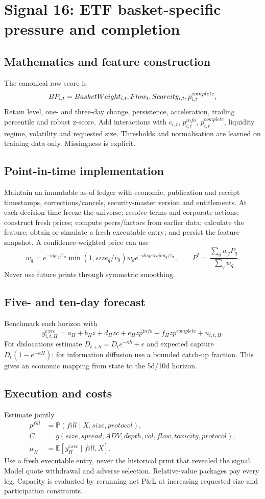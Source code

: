 \documentclass[10pt]{article}
\newcommand{\E}{\mathbb{E}}\newcommand{\Pp}{\mathbb{P}}
\begin{document}
\section{Signal 16: ETF basket-specific pressure and completion}
\subsection{Mathematics and feature construction}
The canonical raw score is
\begin{equation}BP_{i,t}=BasketWeight_{i,t}\\,Flow_t\\,Scarcity_{i,t}\\,p^{complete}_{i,t},\end{equation}
Retain level, one- and three-day change, persistence, acceleration, trailing percentile and robust z-score. Add interactions with $c_{i,t}$, $p^{info}_{i,t}$, $p^{complete}_{i,t}$, liquidity regime, volatility and requested size. Thresholds and normalisation are learned on training data only. Missingness is explicit.

\subsection{Point-in-time implementation}
Maintain an immutable as-of ledger with economic, publication and receipt timestamps, corrections/cancels, security-master version and entitlements. At each decision time freeze the universe; resolve terms and corporate actions; construct fresh prices; compute peers/factors from earlier data; calculate the feature; obtain or simulate a fresh executable entry; and persist the feature snapshot. A confidence-weighted price can use
\[w_q=e^{-age_q/\tau_a}\min(1,size_q/v_0)w_d e^{-dispersion_q/\tau_\sigma},\qquad P^*=\frac{\sum_qw_qP_q}{\sum_qw_q}.\]
Never use future prints through symmetric smoothing.

\subsection{Five- and ten-day forecast}
Benchmark each horizon with
\[y^{exec}_{i,t,H}=a_H+b_Hz+d_Hzc+e_Hzp^{info}+f_Hzp^{complete}+u_{i,t,H}.\]
For dislocations estimate $D_{t+h}=D_te^{-\kappa h}+\epsilon$ and expected capture $D_t(1-e^{-\kappa H})$; for information diffusion use a bounded catch-up fraction. This gives an economic mapping from state to the 5d/10d horizon.

\subsection{Execution and costs}
Estimate jointly
\begin{align}
p^{fill}&=\Pp(fill\mid X,size,protocol),\\
C&=g(size,spread,ADV,depth,vol,flow,toxicity,protocol),\\
\mu_H&=\E[y^{exec}_H\mid fill,X].
\end{align}
Use a fresh executable entry, never the historical print that revealed the signal. Model quote withdrawal and adverse selection. Relative-value packages pay every leg. Capacity is evaluated by rerunning net P\&L at increasing requested size and participation constraints.
\end{document}
